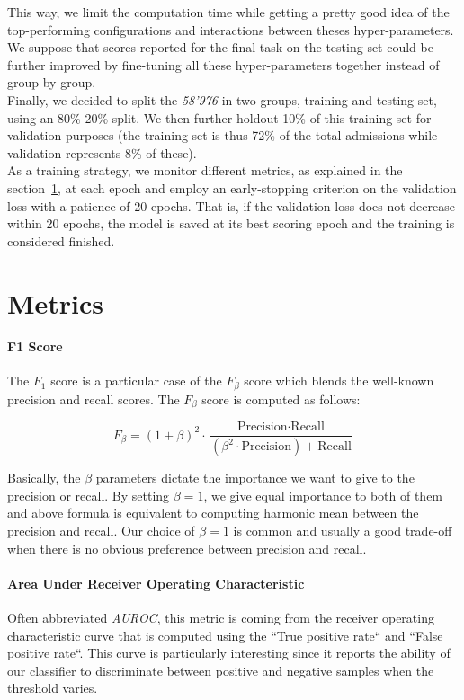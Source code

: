This way, we limit the computation time while getting a pretty good idea of the top-performing configurations and interactions between theses hyper-parameters. We suppose that scores reported for the final task on the testing set could be further improved by fine-tuning all these hyper-parameters together instead of group-by-group. \\

Finally, we decided to split the \emph{58'976} in two groups, training and testing set, using an 80\%-20\% split. We then further holdout 10\% of this training set for validation purposes (the training set is thus 72\% of the total admissions while validation represents 8\% of these). \\

As a training strategy, we monitor different metrics, as explained in the section~\ref{sec:Metrics}, at each epoch and employ an early-stopping criterion on the validation loss with a patience of 20 epochs. That is, if the validation loss does not decrease within 20 epochs, the model is saved at its best scoring epoch and the training is considered finished.

\newpage
\section{Metrics}
\label{sec:Metrics}
\paragraph{F1 Score} The $F_1$ score is a particular case of the $F_\beta$ score which blends the well-known precision and recall scores. The $F_\beta$ score is computed as follows:

\begin{equation}
 F_\beta = (1+\beta)^2 \cdot \frac{\mbox{Precision} \cdot \mbox{Recall}}{(\beta^2 \cdot \mbox{Precision}) + \mbox{Recall}}
\end{equation}

Basically, the $\beta$ parameters dictate the importance we want to give to the precision or recall. By setting $\beta=1$, we give equal importance to both of them and above formula is equivalent to computing harmonic mean between the precision and recall. Our choice of $\beta=1$ is common and usually a good trade-off when there is no obvious preference between precision and recall.

\paragraph{Area Under Receiver Operating Characteristic} Often abbreviated \textit{AUROC}, this metric is coming from the receiver operating characteristic curve that is computed using the ``True positive rate`` and ``False positive rate``. This curve is particularly interesting since it reports the ability of our classifier to discriminate between positive and negative samples when the threshold varies. \\

